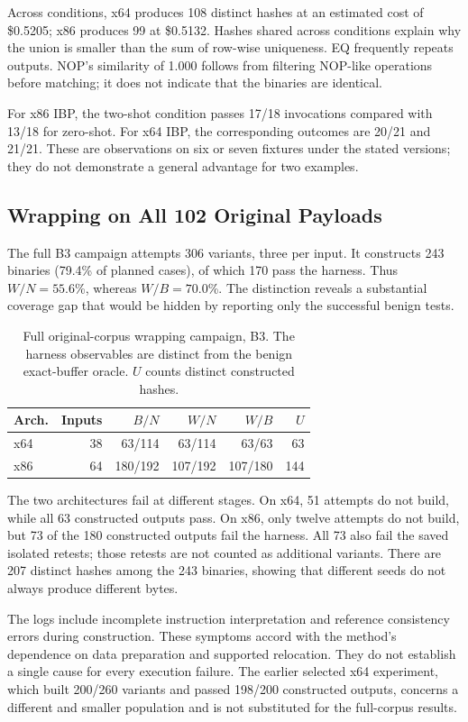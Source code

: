 Across conditions, x64 produces 108 distinct hashes at an estimated cost
of \$0.5205; x86 produces 99 at \$0.5132. Hashes shared across conditions
explain why the union is smaller than the sum of row-wise uniqueness.
EQ frequently repeats outputs. NOP's similarity of 1.000 follows from
filtering NOP-like operations before matching; it does not indicate that
the binaries are identical.

For x86 IBP, the two-shot condition passes 17/18 invocations compared with
13/18 for zero-shot. For x64 IBP, the corresponding outcomes are 20/21 and
21/21. These are observations on six or seven fixtures under the stated
versions; they do not demonstrate a general advantage for two examples.

\subsection{Wrapping on All 102 Original Payloads}
The full B3 campaign attempts 306 variants, three per input. It constructs
243 binaries (79.4\% of planned cases), of which 170 pass the harness.
Thus $W/N=55.6$\%, whereas $W/B=70.0$\%. The distinction reveals a
substantial coverage gap that would be hidden by reporting only the
successful benign tests.


\begin{table}[t]
\caption{Full original-corpus wrapping campaign, B3. The harness
observables are distinct from the benign exact-buffer oracle.
$U$ counts distinct constructed hashes.}
\label{tab:new_wrap_full}
\centering\small
\begin{tabular}{@{}lrrrrr@{}}
\toprule
Arch. & Inputs & $B/N$ & $W/N$ & $W/B$ & $U$ \\
\midrule
x64 & 38 & 63/114 & 63/114 & 63/63 & 63 \\
x86 & 64 & 180/192 & 107/192 & 107/180 & 144 \\
\bottomrule
\end{tabular}
\end{table}


The two architectures fail at different stages. On x64, 51 attempts do
not build, while all 63 constructed outputs pass. On x86, only twelve
attempts do not build, but 73 of the 180 constructed outputs fail the
harness. All 73 also fail the saved isolated retests; those retests are
not counted as additional variants. There are 207 distinct hashes among
the 243 binaries, showing that different seeds do not always produce
different bytes.

The logs include incomplete instruction interpretation and reference
consistency errors during construction. These symptoms accord with the
method's dependence on data preparation and supported relocation. They
do not establish a single cause for every execution failure. The earlier
selected x64 experiment, which built 200/260 variants and passed 198/200
constructed outputs, concerns a different and smaller population and is
not substituted for the full-corpus results.

